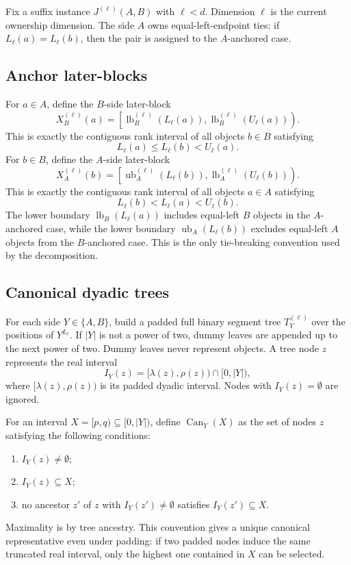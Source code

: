 \documentclass[11pt]{article}
\newcommand{\lb}{\operatorname{lb}}
\newcommand{\ub}{\operatorname{ub}}
\newcommand{\Can}{\operatorname{Can}}
\theoremstyle{definition}
\begin{document}
Fix a suffix instance $J^{(\ell)}(A,B)$ with $\ell<d$.  Dimension $\ell$ is the current ownership dimension.  The side $A$ owns equal-left-endpoint ties: if $L_\ell(a)=L_\ell(b)$, then the pair is assigned to the $A$-anchored case.

\subsection{Anchor later-blocks}

For $a\in A$, define the $B$-side later-block
\[
  X_B^{(\ell)}(a)=
  \left[
    \lb_B^{(\ell)}(L_\ell(a)),
    \lb_B^{(\ell)}(U_\ell(a))
  \right).
\]
This is exactly the contiguous rank interval of all objects $b\in B$ satisfying
\[
  L_\ell(a)\le L_\ell(b)<U_\ell(a).
\]
For $b\in B$, define the $A$-side later-block
\[
  X_A^{(\ell)}(b)=
  \left[
    \ub_A^{(\ell)}(L_\ell(b)),
    \lb_A^{(\ell)}(U_\ell(b))
  \right).
\]
This is exactly the contiguous rank interval of all objects $a\in A$ satisfying
\[
  L_\ell(b)<L_\ell(a)<U_\ell(b).
\]
The lower boundary $\lb_B(L_\ell(a))$ includes equal-left $B$ objects in the $A$-anchored case, while the lower boundary $\ub_A(L_\ell(b))$ excludes equal-left $A$ objects from the $B$-anchored case.  This is the only tie-breaking convention used by the decomposition.

\subsection{Canonical dyadic trees}

For each side $Y\in\{A,B\}$, build a padded full binary segment tree $T_Y^{(\ell)}$ over the positions of $Y^{L_\ell}$.  If $|Y|$ is not a power of two, dummy leaves are appended up to the next power of two.  Dummy leaves never represent objects.  A tree node $z$ represents the real interval
\[
  I_Y(z)=[\lambda(z),\rho(z))\cap[0,|Y|),
\]
where $[\lambda(z),\rho(z))$ is its padded dyadic interval.  Nodes with $I_Y(z)=\emptyset$ are ignored.

For an interval $X=[p,q)\subseteq[0,|Y|)$, define $\Can_Y(X)$ as the set of nodes $z$ satisfying the following conditions:
\begin{enumerate}[leftmargin=1.6em,itemsep=2pt,topsep=2pt]
\item $I_Y(z)\ne\emptyset$;
\item $I_Y(z)\subseteq X$;
\item no ancestor $z'$ of $z$ with $I_Y(z')\ne\emptyset$ satisfies $I_Y(z')\subseteq X$.
\end{enumerate}
Maximality is by tree ancestry.  This convention gives a unique canonical representative even under padding: if two padded nodes induce the same truncated real interval, only the highest one contained in $X$ can be selected.
\end{document}
